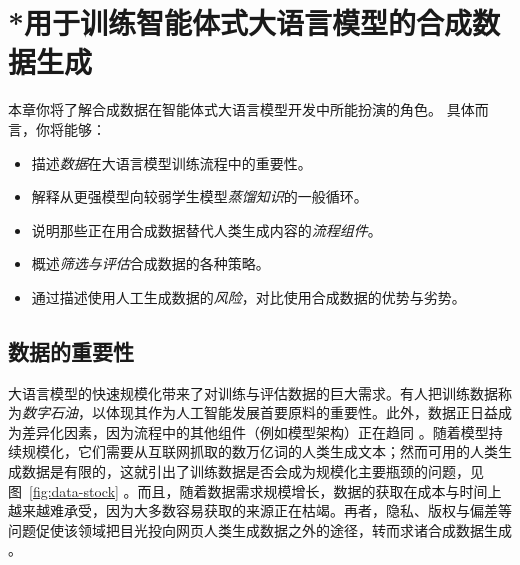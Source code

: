 


\chapter[*合成数据生成]{*用于训练智能体式大语言模型的合成数据生成}\label{chap:synthetic-data}


\begin{learningbox}
本章你将了解合成数据在智能体式大语言模型开发中所能扮演的角色。
具体而言，你将能够：
\begin{itemize}[leftmargin=*, nosep]
    \item 描述{\em 数据}在大语言模型训练流程中的重要性。
    \item 解释从更强模型向较弱学生模型{\em 蒸馏知识}的一般循环。
    \item 说明那些正在用合成数据替代人类生成内容的{\em 流程组件}。
    \item 概述{\em 筛选与评估}合成数据的各种策略。
    \item 通过描述使用人工生成数据的{\em 风险}，对比使用合成数据的优势与劣势。
\end{itemize}
\end{learningbox}

\section{数据的重要性}
大语言模型的快速规模化带来了对训练与评估数据的巨大需求。有人把训练数据称为{\em 数字石油}，以体现其作为人工智能发展首要原料的重要性。此外，数据正日益成为差异化因素，因为流程中的其他组件（例如模型架构）正在趋同 \citep{11072851}。随着模型持续规模化，它们需要从互联网抓取的数万亿词的人类生成文本；然而可用的人类生成数据是有限的，这就引出了训练数据是否会成为规模化主要瓶颈的问题，见图~\ref{fig:data-stock} \citep{villalobos2024position}。而且，随着数据需求规模增长，数据的获取在成本与时间上越来越难承受，因为大多数容易获取的来源正在枯竭。再者，隐私、版权与偏差等问题促使该领域把目光投向网页人类生成数据之外的途径，转而求诸合成数据生成 \citep{liang2022advances}。

